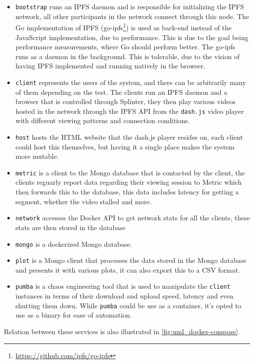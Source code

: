 \begin{itemize}
    \item \texttt{bootstrap} runs an \ac{IPFS} daemon and is responsible for initializing the \ac{IPFS} network, all other participants in the network connect through this node. 
    The Go implementation of \ac{IPFS} (go-ipfs\footnote{\url{https://github.com/ipfs/go-ipfs}}) is used as back-end instead of the JavaScript implementation, due to performance. This is due to the goal being performance measurements, where Go should perform better. The go-ipfs runs as a daemon in the background. This is tolerable, due to the vision of having \ac{IPFS} implemented and running natively in the browser.
    \item \texttt{client} represents the users of the system, and there can be arbitrarily many of them depending on the test. The clients run an \ac{IPFS} daemon and a browser that is controlled through Splinter, they then play various videos hosted in the network through the \ac{IPFS} \ac{API} from the \texttt{dash.js} video player with different viewing patterns and connection conditions.
    \item \texttt{host} hosts the \ac{HTML} website that the dash.js player resides on, each client could host this themselves, but having it a single place makes the system more mutable.
    \item \texttt{metric} is a client to the Mongo database that is contacted by the client, the clients reguarly report data regarding their viewing session to Metric which then forwards this to the database, this data includes latency for getting a segment, whether the video stalled and more.
    \item \texttt{network} accesses the Docker \ac{API} to get network stats for all the clients, these stats are then stored in the database
    \item \texttt{mongo} is a dockerized Mongo database.
    \item \texttt{plot} is a Mongo client that processes the data stored in the Mongo database and presents it with various plots, it can also export this to a \ac{CSV} format.
    \item \texttt{pumba} is a chaos engineering tool that is used to manipulate the \texttt{client} instances in terms of their download and upload speed, latency and even shutting them down. While \texttt{pumba} could be use as a container, it's opted to use as a binary for ease of automation. 
\end{itemize}
Relation between these services is also illustrated in \autoref{fig:uml_docker-compose}.

